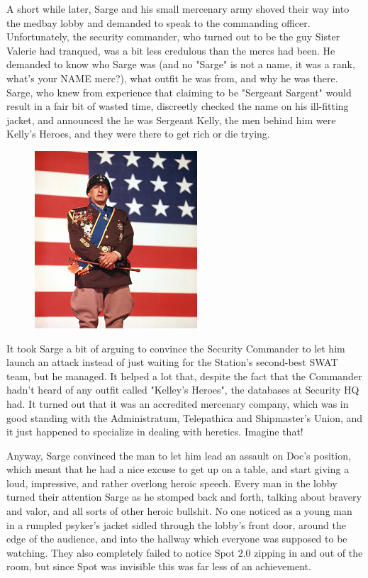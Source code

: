 A short while later, Sarge and his small mercenary army shoved their way into the medbay lobby and demanded to speak to the commanding officer. 
Unfortunately, the security commander, who turned out to be the guy Sister Valerie had tranqued, was a bit less credulous than the mercs had been. 
He demanded to know who Sarge was (and no "Sarge" is not a name, it was a rank, what's your NAME merc?), what outfit he was from, and why he was there. 
Sarge, who knew from experience that claiming to be "Sergeant Sargent" would result in a fair bit of wasted time, discreetly checked the name on his ill-fitting jacket, and announced the he was Sergeant Kelly, the men behind him were Kelly's Heroes, and they were there to get rich or die trying.

\begin{figure}
	\begin{center}
		\includegraphics[width=\figwidth]{pics/14/45.png}
	\end{center}
\end{figure}
It took Sarge a bit of arguing to convince the Security Commander to let him launch an attack instead of just waiting for the Station's second-best SWAT team, but he managed. 
It helped a lot that, despite the fact that the Commander hadn't heard of any outfit called "Kelley's Heroes", the databases at Security HQ had. 
It turned out that it was an accredited mercenary company, which was in good standing with the Administratum, Telepathica and Shipmaster's Union, and it just happened to specialize in dealing with heretics. 
Imagine that!

Anyway, Sarge convinced the man to let him lead an assault on Doc's position, which meant that he had a nice excuse to get up on a table, and start giving a loud, impressive, and rather overlong heroic speech. 
Every man in the lobby turned their attention Sarge as he stomped back and forth, talking about bravery and valor, and all sorts of other heroic bullshit. 
No one noticed as a young man in a rumpled psyker's jacket sidled through the lobby's front door, around the edge of the audience, and into the hallway which everyone was supposed to be watching. 
They also completely failed to notice Spot 2.0 zipping in and out of the room, but since Spot was invisible this was far less of an achievement.


